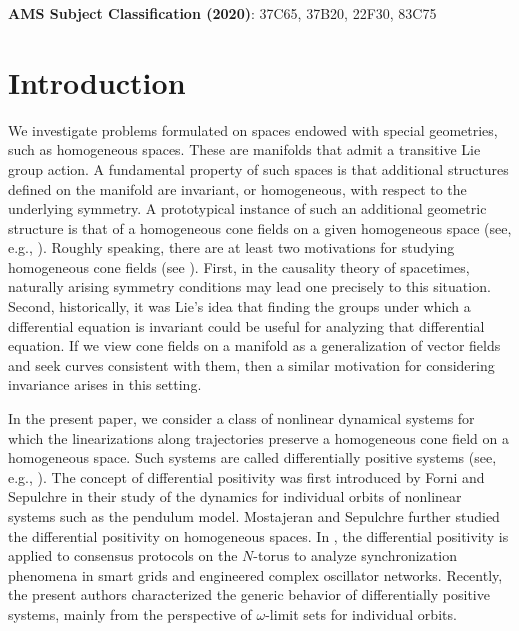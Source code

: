 \documentclass[a4paper,11pt]{article}
\theoremstyle{plain}
\theoremstyle{definition}
\numberwithin{equation}{section}
\begin{document}
	\par \quad \quad \textbf{AMS Subject Classification (2020)}: 37C65, 37B20, 22F30, 83C75
	
\section{Introduction}
	
We investigate problems formulated on spaces endowed with special geometries, such as homogeneous spaces. These are manifolds that admit a transitive Lie group action. A fundamental property of such spaces is that additional structures defined on the manifold are invariant, or homogeneous, with respect to the underlying symmetry. A prototypical instance of such an additional geometric structure is that of a homogeneous cone fields on a given homogeneous space (see, e.g., \cite{HilgertNeeb93,HilgertHofmannLawson,Neeb91}). Roughly speaking, there are at least two motivations for studying homogeneous cone fields (see \cite{Lawson89}). First, in the causality theory of spacetimes, naturally arising symmetry conditions may lead one precisely to this situation. Second, historically, it was Lie's idea that finding the groups under which a differential equation is invariant could be useful for analyzing that differential equation. If we view cone fields on a manifold as a generalization of vector fields and seek curves consistent with them, then a similar motivation for considering invariance arises in this setting.


In the present paper, we consider a class of nonlinear dynamical systems for which the linearizations along trajectories preserve a homogeneous cone field on a homogeneous space. Such systems are called differentially positive systems (see, e.g., \cite{ForniandSepulchre16,NW25}). The concept of differential positivity was first introduced by Forni and Sepulchre \cite{ForniandSepulchre14,ForniandSepulchre16} in their study of the dynamics for individual orbits of nonlinear systems such as the pendulum model. Mostajeran and Sepulchre \cite{MostajeranSepulchre18homogeneous,MostajeranSepulchre18SIAM} further studied the differential positivity on homogeneous spaces. In \cite[Section 4]{MostajeranSepulchre18SIAM}, the differential positivity is applied to consensus protocols on the $N$-torus to analyze synchronization phenomena in smart grids and engineered complex oscillator networks. Recently, the present authors \cite{NW25,NWZ26} characterized the generic behavior of differentially positive systems, mainly from the perspective of $\omega$-limit sets for individual orbits. 
\end{document}
